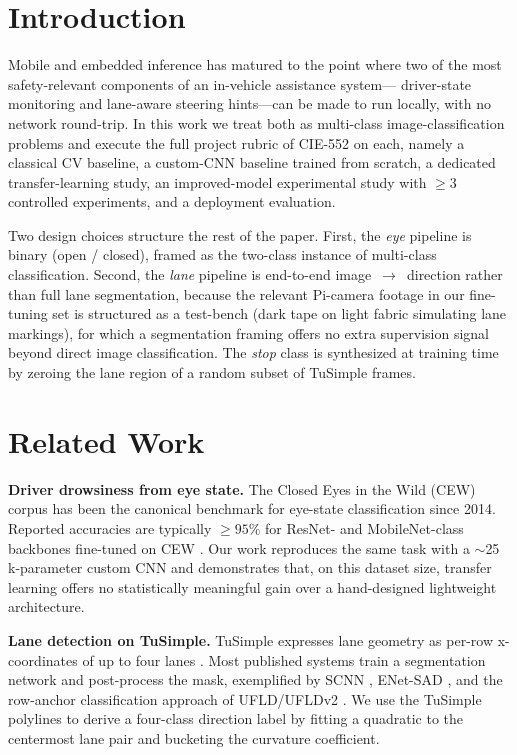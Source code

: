 \documentclass[conference]{IEEEtran}
\begin{document}
\section{Introduction}\label{sec:intro}

Mobile and embedded inference has matured to the point where two of the
most safety-relevant components of an in-vehicle assistance system---
driver-state monitoring and lane-aware steering hints---can be made to
run locally, with no network round-trip. In this work we treat both as
multi-class image-classification problems and execute the full project
rubric of CIE-552 on each, namely a classical CV baseline, a custom-CNN
baseline trained from scratch, a dedicated transfer-learning study, an
improved-model experimental study with $\geq 3$ controlled experiments,
and a deployment evaluation.

Two design choices structure the rest of the paper. First, the
\emph{eye} pipeline is binary (open / closed), framed as the two-class
instance of multi-class classification. Second, the \emph{lane}
pipeline is end-to-end image~$\rightarrow$~direction rather than full
lane segmentation, because the relevant Pi-camera footage in our
fine-tuning set is structured as a test-bench (dark tape on light
fabric simulating lane markings), for which a segmentation framing
offers no extra supervision signal beyond direct image classification.
The \textit{stop} class is synthesized at training time by zeroing the
lane region of a random subset of TuSimple frames.

\section{Related Work}\label{sec:related}

\textbf{Driver drowsiness from eye state.}
The Closed Eyes in the Wild (CEW) corpus has been the canonical
benchmark for eye-state classification since 2014. Reported accuracies
are typically $\geq 95\%$ for ResNet- and MobileNet-class backbones
fine-tuned on CEW \cite{drowsiness2024,effres2025,transformerdrowsy2025}.
Our work reproduces the same task with a $\sim$25\,k-parameter custom
CNN and demonstrates that, on this dataset size, transfer learning
offers no statistically meaningful gain over a hand-designed lightweight
architecture.

\textbf{Lane detection on TuSimple.}
TuSimple expresses lane geometry as per-row x-coordinates of up to four
lanes \cite{tusimple}. Most published systems train a segmentation
network and post-process the mask, exemplified by SCNN \cite{scnn},
ENet-SAD \cite{enetsad}, and the row-anchor classification approach of
UFLD/UFLDv2 \cite{ufldv2}. We use the TuSimple polylines to derive a
four-class direction label by fitting a quadratic to the centermost
lane pair and bucketing the curvature coefficient.
\end{document}
